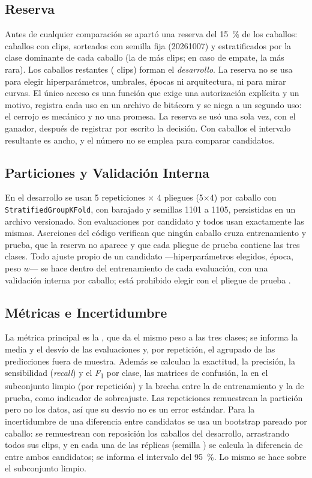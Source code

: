 \subsection{Reserva}
Antes de cualquier comparación se apartó una reserva del 15~\% de los caballos: \CaballosReserva{} caballos con \ClipsReserva{} clips, sorteados con semilla fija (20261007) y estratificados por la clase dominante de cada caballo (la de más clips; en caso de empate, la más rara). Los \CaballosDesarrollo{} caballos restantes (\ClipsDesarrollo{} clips) forman el \textit{desarrollo}. La reserva no se usa para elegir hiperparámetros, umbrales, épocas ni arquitectura, ni para mirar curvas. El único acceso es una función que exige una autorización explícita y un motivo, registra cada uso en un archivo de bitácora y se niega a un segundo uso: el cerrojo es mecánico y no una promesa. La reserva se usó una sola vez, con el ganador, después de registrar por escrito la decisión. Con \CaballosReserva{} caballos el intervalo resultante es ancho, y el número no se emplea para comparar candidatos.

\subsection{Particiones y Validación Interna}
En el desarrollo se usan 5 repeticiones $\times$ 4 pliegues (5$\times$4) por caballo con \texttt{Stratified\-Group\-KFold}, con barajado y semillas 1101 a 1105, persistidas en un archivo versionado. Son \Evaluaciones{} evaluaciones por candidato y todos usan exactamente las mismas. Aserciones del código verifican que ningún caballo cruza entrenamiento y prueba, que la reserva no aparece y que cada pliegue de prueba contiene las tres clases. Todo ajuste propio de un candidato ---hiperparámetros elegidos, época, peso $w$--- se hace dentro del entrenamiento de cada evaluación, con una validación interna por caballo; está prohibido elegir con el pliegue de prueba \parencite{cawley2010}.

\subsection{Métricas e Incertidumbre}
La métrica principal es la \fmacro{} \parencite{sokolova2009}, que da el mismo peso a las tres clases; se informa la media y el desvío de las \Evaluaciones{} evaluaciones y, por repetición, el \fmacro{} agrupado de las predicciones fuera de muestra. Además se calculan la exactitud, la precisión, la sensibilidad (\textit{recall}) y el \textit{F}\textsubscript{1} por clase, las matrices de confusión, la \fmacro{} en el subconjunto limpio (por repetición) y la brecha entre la \fmacro{} de entrenamiento y la de prueba, como indicador de sobreajuste. Las repeticiones remuestrean la partición pero no los datos, así que su desvío no es un error estándar. Para la incertidumbre de una diferencia entre candidatos se usa un bootstrap \parencite{efron1993} pareado por caballo: se remuestrean con reposición los caballos del desarrollo, arrastrando todos sus clips, y en cada una de las \ReplicasBootstrap{} réplicas (semilla \SemillaBootstrap{}) se calcula la diferencia de \fmacro{} entre ambos candidatos; se informa el intervalo del 95~\%. Lo mismo se hace sobre el subconjunto limpio.

